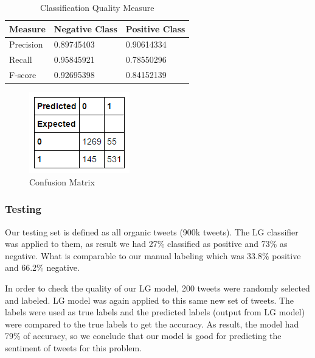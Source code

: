 \documentclass{sig-alternate}
\begin{document}
\begin{table}[httbp]
\caption{Classification Quality Measure}
\centering
\begin{tabular}{ | l | l | l | }
\hline
\textbf{Measure} & \textbf{Negative Class} & \textbf{Positive Class}\\
\hline
Precision & 0.89745403 & 0.90614334\\
\hline
Recall & 0.95845921 & 0.78550296 \\
\hline
F-score & 0.92695398 & 0.84152139\\
\hline
\end{tabular}
\label{tab:measure}
\end{table}

\begin{figure}[t]
\includegraphics[width=\columnwidth]{matrix.png}
\centering
\caption{Confusion Matrix}
\label{figura:matrix}
\end{figure}

\subsubsection{Testing}
\label{sec:test}
Our testing set is defined as all organic tweets (900k tweets). The LG classifier was applied to them, as result we had 27\% classified as positive and 73\% as negative. What is comparable to our manual labeling which was 33.8\% positive and 66.2\% negative. 

In order to check the quality of our LG model, 200 tweets were randomly selected and labeled. LG model was again applied to this same new set of tweets. The labels were used as true labels and the predicted labels (output from LG model) were compared to the true labels to get the accuracy. As result, the model had 79\% of accuracy, so we conclude that our model is good for predicting the sentiment of tweets for this problem.
\end{document}
